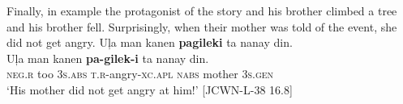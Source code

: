 Finally, in example  the protagonist of the story and his brother climbed a tree and his brother fell. Surprisingly, when their mother was told of the event, she did not get angry.
\ea
\label{ex:getangry}
Uļa  man  kanen  \textbf{pagileki}  ta  nanay  din. \\\smallskip
\gll Uļa  man  kanen  \textbf{pa-gilek-i}  ta  nanay  din. \\
\textsc{neg.r} too  3\textsc{s.abs}  \textsc{t.r}-angry-\textsc{xc.apl}  \textsc{nabs}  mother  3\textsc{s.gen} \\
\glt ‘His mother did not get angry at him!’ [JCWN-L-38 16.8]
\z
